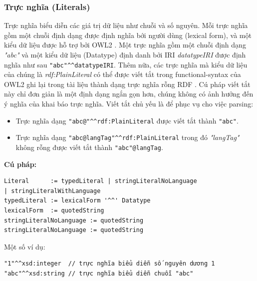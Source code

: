 \subsubsection{Trực nghĩa (Literals)}
Trực nghĩa biểu diễn các giá trị dữ liệu như chuỗi và số nguyên. Mỗi trực nghĩa gồm một chuỗi định dạng được định nghĩa bới người dùng (lexical form), và một kiểu dữ liệu được hỗ trợ bởi OWL2 \cite{owl2spec} . Một trực nghĩa gồm một chuỗi định dạng \textit{"abc"} và một kiểu dữ liệu (Datatype) định danh bởi IRI \textit{datatypeIRI} được định nghĩa như sau \verb|"abc"^^datatypeIRI|. Thêm nữa, các trực nghĩa mà kiểu dữ liệu của chúng là \textit{rdf:PlainLiteral} có thể được viết tắt trong functional-syntax của OWL2 ghi lại trong tài liệu thành dạng trực nghĩa rỗng RDF \cite{rdf_concept}. Cú pháp viết tắt này chỉ đơn giản là một định dạng ngắn gọn hơn, chúng không có ảnh hưởng đến ý nghĩa của khai báo trực nghĩa. Viết tắt chủ yếu là để phục vụ cho việc parsing:
\begin{itemize}
\item Trực nghĩa dạng \verb|"abc@"^^rdf:PlainLiteral| được viết tắt thành \verb|"abc"|.
\item Trực nghĩa dạng \verb|"abc@langTag"^^rdf:PlainLiteral| trong đó \textit{"langTag"} không rỗng được viết tắt thành \verb|"abc"@langTag|.
\end{itemize}
\textbf{Cú pháp:}
\begin{verbatim}
Literal      := typedLiteral | stringLiteralNoLanguage 
| stringLiteralWithLanguage
typedLiteral := lexicalForm '^^' Datatype
lexicalForm  := quotedString
stringLiteralNoLanguage := quotedString
stringLiteralNoLanguage := quotedString
\end{verbatim}
Một số ví dụ:
\begin{verbatim}
"1"^^xsd:integer  // trực nghĩa biểu diễn số nguyên dương 1
"abc"^^xsd:string // trực nghĩa biểu diễn chuỗi "abc"
\end{verbatim}

